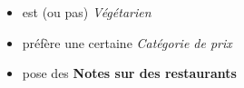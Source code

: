 \documentclass[10pt,a4paper]{article}
\begin{document}
\begin{enumerate}
\begin{itemize}
		\item est (ou pas) \textit{Végétarien}
		\item préfère une certaine \textit{Catégorie de prix}
		\item pose des \textbf{Notes sur des restaurants}
	\end{itemize}
\end{enumerate}
\end{document}
